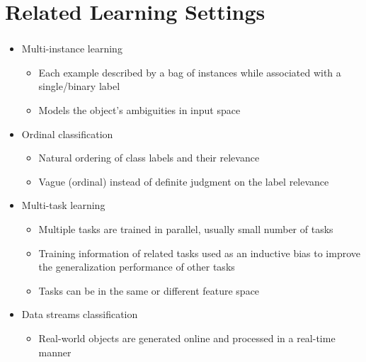 \documentclass{beamer}
\begin{document}
\section{Related Learning Settings}
\begin{frame}
\frametitle{\insertsection}
\begin{itemize}
	\item Multi-instance learning
	\begin{itemize}
		\item Each example described by a bag of instances while associated with a single/binary label
		\item Models the object’s ambiguities in input space
	\end{itemize}
	\item Ordinal classification
	\begin{itemize}
		\item Natural ordering of class labels and their relevance
		\item Vague (ordinal) instead
of definite judgment on the label relevance
	\end{itemize}
	\item Multi-task learning
	\begin{itemize}
		\item Multiple tasks are trained in parallel, usually small number of tasks
		\item Training
information of related tasks used as an inductive bias to improve the generalization performance of other tasks
		\item Tasks
can be in the same or different feature space
	\end{itemize}
	\item Data streams classification
	\begin{itemize}
		\item Real-world objects are generated online and processed in a real-time manner
	\end{itemize}
\end{itemize}
\end{frame}

\end{document}
